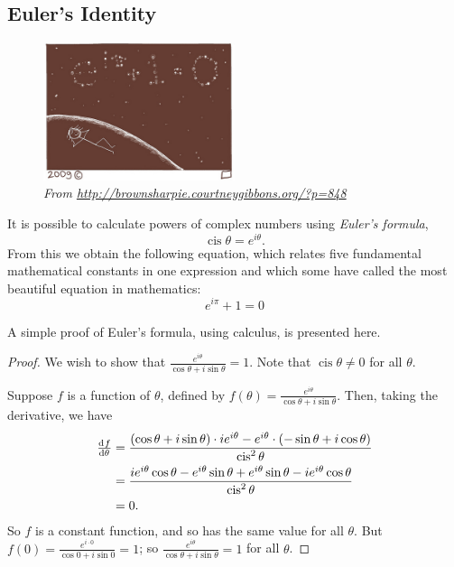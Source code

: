 \documentclass[a4paper,10pt,titlepage]{article}
\theoremstyle{definition}
\DeclareMathOperator{\cis}{cis}
\begin{document}
\subsection*{Euler's Identity}
\begin{figure}[h]
  \begin{center}
    \includegraphics[width=0.5\textwidth]{stars}\\
    \small{\textit{From \url{http://brownsharpie.courtneygibbons.org/?p=848}}}
  \end{center}
\end{figure}
It is possible to calculate powers of complex numbers using \emph{Euler's formula},
\begin{displaymath}
  \cis \theta = e^{i\theta}.
\end{displaymath}
From this we obtain the following equation, which relates five fundamental mathematical constants
in one expression and which some have called the most beautiful equation in mathematics:
\begin{equation}
  \tag{Euler's Identity}
  e^{i\pi} + 1 = 0
\end{equation}

A simple proof of Euler's formula, using calculus, is presented here.

\begin{proof}
  We wish to show that $ \frac{e^{i\theta}}{\cos\theta+i\sin\theta} = 1 $. Note that $ \cis\theta \neq 0 $ for all $ \theta $.

  Suppose $ f $ is a function of $ \theta $, defined by $ f(\theta) = \frac{e^{i\theta}}{\cos\theta+i\sin\theta} $.
  Then, taking the derivative, we have
  \begin{align*}
    \od{f}{\theta} &= \frac{(\cos \theta + i\sin \theta) \cdot i e^{i\theta} - e^{i\theta} \cdot (-\sin \theta + i \cos \theta)}{\cis^2 \theta}\\
                   &= \frac{ie^{i\theta}\cos\theta - e^{i\theta}\sin\theta + e^{i\theta}\sin\theta - ie^{i\theta}\cos\theta}{\cis^2\theta}\\
                   &= 0.
  \end{align*}
  So $ f $ is a constant function, and so has the same value for all $ \theta $. But $ f(0) = \frac{e^{i\cdot 0}}{\cos 0 + i\sin 0} = 1 $;
  so $ \frac{e^{i\theta}}{\cos\theta+i\sin\theta} = 1 $ for all $ \theta $.
\end{proof}
\end{document}
